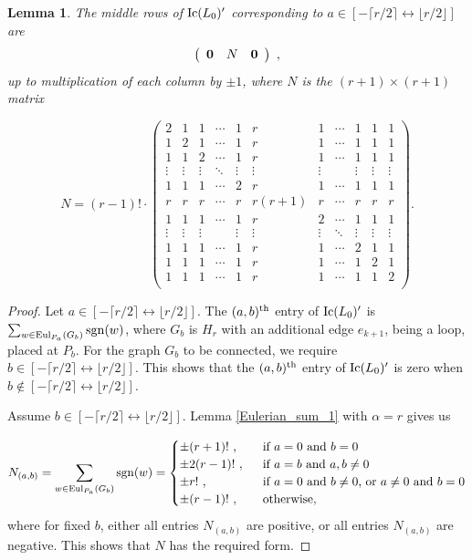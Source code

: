 \documentclass{amsproc}
\newtheorem{lemma}[theorem]{Lemma}
\theoremstyle{definition}
\theoremstyle{remark}
\numberwithin{equation}{section}
\newcommand{\sgn}{{\rm sgn}}
\newcommand{\Ic}{{\rm Ic}}
\newcommand{\uni}{{\rm Eul}}
\newcommand{\interval}{\longleftrightarrow}
\begin{document}
\begin{lemma}\label{N_lemma}
The middle rows of $\Ic(L_0)'$ corresponding to $a\in [-\lceil r/2\rceil\interval \lfloor r/2\rfloor]$ are
\[\left(\begin{array}{ccc}{\bf 0}&N&{\bf 0}\end{array}\right)\ ,\]
up to multiplication of each column by $\pm 1$, where $N$ is the $(r +1) \times (r + 1)$ matrix
\item 
\begin{equation} 
N = (r-1)!\cdot\left(
\begin{array}{ccccccccccc}
2&1&1&\cdots&1&r&1&\cdots&1&1&1\\
1&2&1&\cdots&1&r&1&\cdots&1&1&1\\
1&1&2&\cdots&1&r&1&\cdots&1&1&1\\
\vdots&\vdots&\vdots&\ddots&\vdots&\vdots&\vdots&&\vdots&\vdots&\vdots\\
1&1&1&\cdots&2&r&1&\cdots&1&1&1\\
r&r&r&\cdots&r&r(r+1)&r&\cdots&r&r&r\\
1&1&1&\cdots&1&r&2&\cdots&1&1&1\\
\vdots&\vdots&\vdots&&\vdots&\vdots&\vdots&\ddots&\vdots&\vdots&\vdots\\
1&1&1&\cdots&1&r&1&\cdots&2&1&1\\
1&1&1&\cdots&1&r&1&\cdots&1&2&1\\
1&1&1&\cdots&1&r&1&\cdots&1&1&2\\
\end{array}
\right).
\end{equation}
\end{lemma}

\begin{proof}
Let $a\in[-\lceil r/2\rceil\interval \lfloor r/2\rfloor]$. The $(a,b)^{\rm th}$ entry of $\Ic(L_0)'$ is 
$\sum_{w\in \uni_{P_a}(G_b)}\sgn(w)$, where $G_b$ is $H_r$ with an additional edge $e_{k+1}$, being a loop, 
placed at $P_b$. For the graph $G_b$ to be connected, we require $b\in [-\lceil r/2\rceil\interval \lfloor r/2\rfloor]$. This shows that the $(a,b)^{\rm th}$ entry of $\Ic(L_0)'$ is zero when $b\notin[-\lceil r/2\rceil\interval \lfloor r/2\rfloor]$. 

Assume $b\in [-\lceil r/2\rceil\interval \lfloor r/2\rfloor]$. Lemma \ref{Eulerian_sum_1} with $\alpha=r$ gives us

\[N_{(a,b)}=\sum_{w\in \uni_{P_a}(G_b)}\sgn(w)=\begin{cases}
\pm (r+1)!\ ,\ &\text{ if $a=0$ and $b=0$}\\
\pm 2(r-1)!\ ,\ &\text{ if $a=b$ and $a,b\neq 0$}\\
\pm r!\ ,\ &\text{ if $a=0$ and $b\neq 0$, or $a\neq 0$ and $b=0$}\\
\pm (r-1)!\ ,\ &\text{ otherwise,}
\end{cases}\]
where for fixed $b$, either all entries $N_{(a,b)}$ are positive, or all entries $N_{(a,b)}$ are negative. This shows that $N$ has the required form.
\end{proof}
\end{document}
